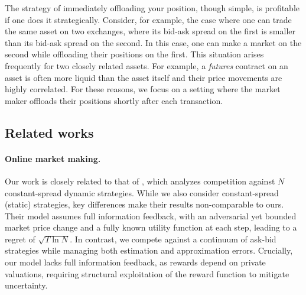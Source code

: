 \documentclass[final,12pt]{colt2025}
\begin{document}
The strategy of immediately offloading your position, though simple, is profitable if one does it strategically. 
Consider, for example, the case where one can trade the same asset on two exchanges, where its bid-ask spread on the first is smaller than its bid-ask spread on the second. 
In this case, one can make a market on the second while offloading their positions on the first. 
This situation arises frequently for two closely related assets.
For example, a \emph{futures} contract on an asset is often more liquid than the asset itself and their price movements are highly correlated. 
For these reasons, we focus on a setting where the market maker offloads their positions shortly after each transaction. 



\subsection{Related works}

\paragraph{Online market making.}
Our work is closely related to that of \citet{abernethy2013adaptive}, which analyzes competition against $N$ constant-spread dynamic strategies. While we also consider constant-spread (static) strategies, key differences make their results non-comparable to ours. Their model assumes full information feedback, with an adversarial yet bounded market price change and a fully known utility function at each step, leading to a regret of $\sqrt{T\ln N}$. In contrast, we compete against a continuum of ask-bid strategies while managing both estimation and approximation errors. Crucially, our model lacks full information feedback, as rewards depend on private valuations, requiring structural exploitation of the reward function to mitigate uncertainty.
\end{document}
